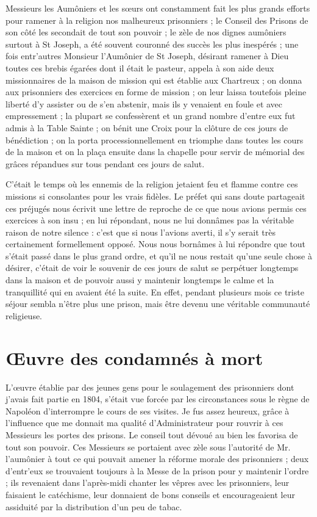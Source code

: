 \documentclass[11pt,a4paper]{report}
\begin{document}
Messieurs les Aumôniers et les sœurs ont constamment fait les plus grands efforts pour ramener à la religion nos malheureux prisonniers ; le Conseil des Prisons de son côté les secondait de tout son pouvoir ; le zèle de nos dignes aumôniers surtout à St Joseph, a été souvent couronné des succès les plus inespérés ; une fois entr'autres Monsieur l'Aumônier de St Joseph, désirant ramener à Dieu toutes ces brebis égarées dont il était le pasteur, appela à son aide deux missionnaires de la maison de mission qui est établie aux Chartreux ; on donna aux prisonniers des exercices en forme de mission ; on leur laissa toutefois pleine liberté d'y assister ou de s'en abstenir, mais ils y venaient en foule et avec empressement ; la plupart se confessèrent et un grand nombre d'entre eux fut admis à la Table Sainte ; on bénit une Croix pour la clôture de ces jours de bénédiction ; on la porta processionnellement en triomphe dans toutes les cours de la maison et on la plaça ensuite dans la chapelle pour servir de mémorial des grâces répandues sur tous pendant ces jours de salut.

C'était le temps où les ennemis de la religion jetaient feu et flamme contre ces missions si consolantes pour les vrais fidèles. Le préfet qui sans doute partageait ces préjugés nous écrivit une lettre de reproche de ce que nous avions permis ces exercices à son insu ; en lui répondant, nous ne lui donnâmes pas la véritable raison de notre silence : c'est que si nous l'avions averti, il s'y serait très certainement formellement opposé. Nous nous bornâmes à lui répondre que tout s'était passé dans le plus grand ordre, et qu'il ne nous restait qu'une seule chose à désirer, c'était de voir le souvenir de ces jours de salut se perpétuer longtemps dans la maison et de pouvoir aussi y maintenir longtemps le calme et la tranquillité qui en avaient été la suite. En effet, pendant plusieurs mois ce triste séjour sembla n'être plus une prison, mais être devenu une véritable communauté religieuse.

\section*{Œuvre des condamnés à mort}

L'œuvre établie par des jeunes gens pour le soulagement des prisonniers dont j'avais fait partie en 1804, s'était vue forcée par les circonstances sous le règne de Napoléon d'interrompre le cours de ses visites. Je fus assez heureux, grâce à l'influence que me donnait ma qualité d'Administrateur pour rouvrir à ces Messieurs les portes des prisons. Le conseil tout dévoué au bien les favorisa de tout son pouvoir. Ces Messieurs se portaient avec zèle sous l'autorité de Mr. l'aumônier à tout ce qui pouvait amener la réforme morale des prisonniers ; deux d'entr'eux se trouvaient toujours à la Messe de la prison pour y maintenir l'ordre ; ils revenaient dans l'après-midi chanter les vêpres avec les prisonniers, leur faisaient le catéchisme, leur donnaient de bons conseils et encourageaient leur assiduité par la distribution d'un peu de tabac.
\end{document}
